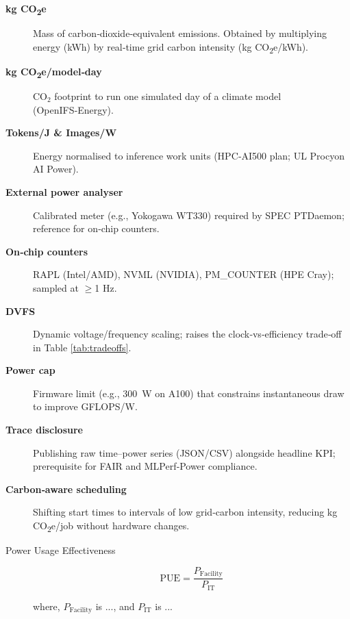 \begin{description}
\item[\textbf{kg CO\textsubscript{2}e}] Mass of carbon‑dioxide‑equivalent
      emissions.  Obtained by multiplying energy (kWh) by real‑time grid
      carbon intensity (kg CO\textsubscript{2}e/kWh).

\item[\textbf{kg CO\textsubscript{2}e/model‑day}]
      CO\(_2\) footprint to run one simulated day of a climate model
      (OpenIFS‑Energy).

\item[\textbf{Tokens/J \& Images/W}]
      Energy normalised to inference work units (HPC‑AI500 plan; UL
      Procyon AI Power).

\item[\textbf{External power analyser}] Calibrated meter (e.g.,
      Yokogawa WT330) required by SPEC PTDaemon; reference for on‑chip
      counters.

\item[\textbf{On‑chip counters}] RAPL (Intel/AMD), NVML (NVIDIA),
      PM\_COUNTER (HPE Cray); sampled at \(\ge\)1 Hz.

\item[\textbf{DVFS}] Dynamic voltage/frequency scaling; raises the
      clock‑vs‑efficiency trade‑off in Table \ref{tab:tradeoffs}.

\item[\textbf{Power cap}] Firmware limit (e.g., \SI{300}{W} on A100)
      that constrains instantaneous draw to improve GFLOPS/W.

\item[\textbf{Trace disclosure}] Publishing raw time–power series
      (JSON/CSV) alongside headline KPI; prerequisite for FAIR and
      MLPerf‑Power compliance.

\item[\textbf{Carbon‑aware scheduling}] Shifting start times to intervals
      of low grid‑carbon intensity, reducing kg CO\textsubscript{2}e/job
      without hardware changes.

\end{description}



\begin{description}
    \item[ Power Usage Effectiveness] 

\begin{equation}
    \text{PUE} = \frac{P_{\text{Facility}}}{P_{\text{IT}}}
\end{equation}

where, $P_{\text{Facility}}$ is ..., and $P_{\text{IT}}$ is ...
    
\end{description}



